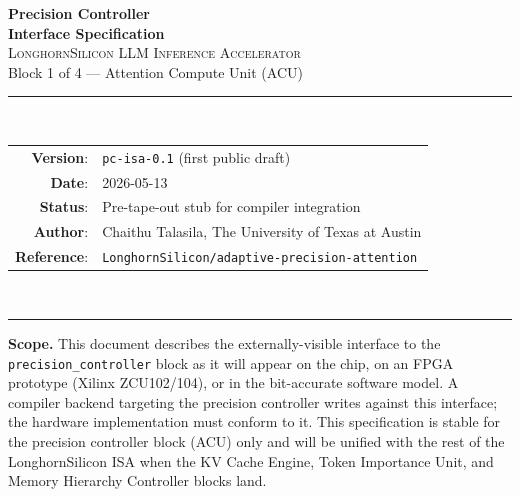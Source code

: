 \documentclass[11pt]{article}
\begin{document}
\thispagestyle{empty}
\begin{center}
\vspace*{1.2in}
{\Huge\bfseries Precision Controller}\\[0.4em]
{\LARGE\bfseries Interface Specification}\\[1.2em]

{\large \textsc{LonghornSilicon LLM Inference Accelerator}}\\[0.4em]
{\large Block 1 of 4 --- Attention Compute Unit (ACU)}\\[2em]

\rule{0.7\textwidth}{0.4pt}\\[1em]

\begin{tabular}{rl}
\textbf{Version}:    & \texttt{pc-isa-0.1} (first public draft) \\
\textbf{Date}:       & 2026-05-13 \\
\textbf{Status}:     & Pre-tape-out stub for compiler integration \\
\textbf{Author}:     & Chaithu Talasila, The University of Texas at Austin \\
\textbf{Reference}:  & \texttt{LonghornSilicon/adaptive-precision-attention} \\
\end{tabular}\\[1em]
\rule{0.7\textwidth}{0.4pt}

\vfill
\begin{minipage}{0.85\textwidth}
\small
\textbf{Scope.} This document describes the externally-visible interface to the
\texttt{precision\_controller} block as it will appear on the chip, on an
FPGA prototype (Xilinx ZCU102/104), or in the bit-accurate software model.
A compiler backend targeting the precision controller writes against this
interface; the hardware implementation must conform to it. This specification
is stable for the precision controller block (ACU) only and will be unified
with the rest of the LonghornSilicon ISA when the KV Cache Engine, Token
Importance Unit, and Memory Hierarchy Controller blocks land.
\end{minipage}

\vspace{0.3in}
\end{center}

\clearpage
\end{document}
